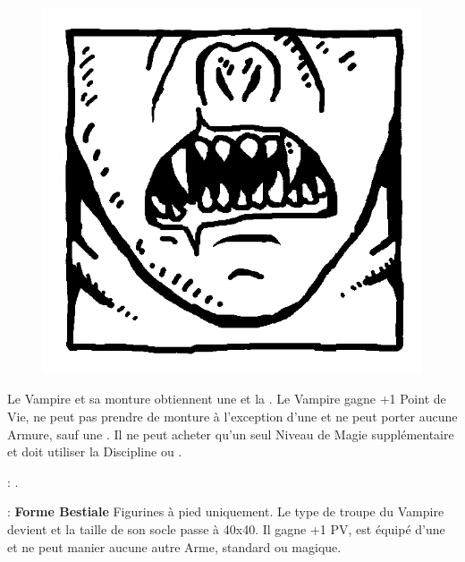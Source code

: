 \begin{figure}
\centering
\includegraphics[width=\logosize]{pics/logo_strigoi.png}
\end{figure}
Le Vampire et sa monture obtiennent une  et la \hatred{}. Le Vampire gagne +1 Point de Vie, ne peut pas prendre de monture à l'exception d'une \shriekinghorror{} et ne peut porter aucune Armure, sauf une \mountsprotection{}. Il ne peut acheter qu'un seul Niveau de Magie supplémentaire et doit utiliser la Discipline \wilderness{} ou \necromancy{}.

\vspace{0.5cm}
\bloodties{} : \textbf{\ghouls{}}.

\vspace{0.5cm}
\ancientbloodpower{} : \textbf{Forme Bestiale}\dotfill{}\newline%
Figurines à pied uniquement.\newline
Le type de troupe du Vampire devient \monstrousinfantry{} et la taille de son socle passe à \unit{40x40}{\milli\meter}. Il gagne +1 PV, est équipé d'une \pw{} et ne peut manier aucune autre Arme, standard ou magique.


